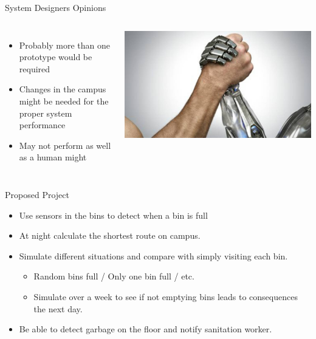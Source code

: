 \documentclass[18pt]{beamer}
\begin{document}
    \begin{frame}{System Designers Opinions}
        \begin{columns}
            \begin{itemize}
                \item Probably more than one prototype would be required \pause
                \item Changes in the campus might be needed for the proper system performance \pause
                \item May not perform as well as a human might
            \end{itemize}
            \includegraphics[width=0.99\columnwidth]{humanvsrobot}
        \end{columns}
    \end{frame}

    \begin{frame}{Proposed Project}
        \begin{itemize}
            \item Use sensors in the bins to detect when a bin is full \pause
            \item At night calculate the shortest route on campus. \pause
            \item Simulate different situations and compare with simply visiting each bin. \pause
                \begin{itemize}
                     \item Random bins full / Only one bin full / etc.\pause
                     \item Simulate over a week to see if not emptying bins leads to consequences the next day. \pause
                \end{itemize}
            \item Be able to detect garbage on the floor and notify sanitation worker.
        \end{itemize}
    \end{frame}
\end{document}
